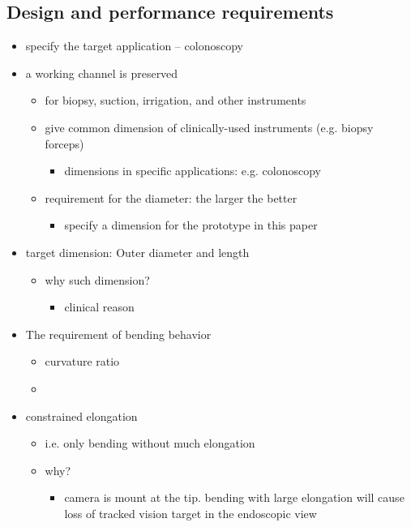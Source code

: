 \documentclass[journal,onecolumn]{IEEEtran}
\begin{document}
\subsection{Design and performance requirements}
\label{sec:org12c4c04}
\begin{itemize}
\item specify the target application -- colonoscopy

\item a working channel is preserved
\begin{itemize}
\item for biopsy, suction, irrigation, and other instruments
\item give common dimension of clinically-used instruments (e.g. biopsy forceps)
\begin{itemize}
\item dimensions in specific applications: e.g. colonoscopy
\end{itemize}
\item requirement for the diameter: the larger the better
\begin{itemize}
\item specify a dimension for the prototype in this paper
\end{itemize}
\end{itemize}

\item target dimension: Outer diameter and length
\begin{itemize}
\item why such dimension?
\begin{itemize}
\item clinical reason
\end{itemize}
\end{itemize}

\item The requirement of bending behavior
\begin{itemize}
\item curvature ratio
\item 
\end{itemize}

\item constrained elongation
\begin{itemize}
\item i.e. only bending without much elongation
\item why?
\begin{itemize}
\item camera is mount at the tip. bending with large elongation will cause loss of tracked vision target in the endoscopic view
\end{itemize}
\end{itemize}


\end{itemize}
\end{document}
